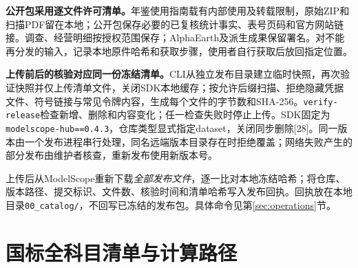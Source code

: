 \documentclass[12pt,a4paper,fontset=fandol]{ctexart}
\newcommand{\file}[1]{\nolinkurl{#1}}
\begin{document}
\textbf{公开包采用逐文件许可清单。}年鉴使用指南载有内部使用及转载限制，原始ZIP和扫描PDF留在本地；公开包保存必要的已复核统计事实、表号页码和官方网站链接。调查、经营明细按授权范围保存；AlphaEarth及派生成果保留署名。对不能再分发的输入，记录本地原件哈希和获取步骤，使用者自行获取后放回指定位置。

\textbf{上传前后的核验对应同一份冻结清单。}CLI从独立发布目录建立临时快照，再次验证快照并仅上传清单文件，关闭SDK本地缓存；按允许后缀扫描、拒绝隐藏凭据文件、符号链接与常见令牌内容，生成每个文件的字节数和SHA-256。\file{verify-release}检查新增、删除和内容变化；任一检查失败时停止上传。SDK固定为\file{modelscope-hub==0.4.3}，仓库类型显式指定dataset，关闭同步删除[28]。同一版本由一个发布进程串行处理，同名远端版本目录存在时拒绝覆盖；网络失败产生的部分发布由维护者核查，重新发布使用新版本号。

上传后从ModelScope重新下载\emph{全部发布文件}，逐一比对本地冻结哈希；将仓库、版本路径、提交标识、文件数、核验时间和清单哈希写入发布回执。回执放在本地目录\file{00_catalog/}，不回写已冻结的发布包。具体命令见第\ref{sec:operations}节。

\section{国标全科目清单与计算路径}
\end{document}
